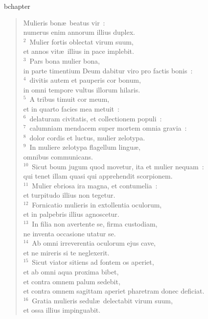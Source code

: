 bchapter\begin{verse}\vspace{-19pt}Mulieris bon\ae\ beatus vir~:\\ numerus enim annorum illius duplex.\\
${}^{2}$~Mulier fortis oblectat virum suum,\\ et annos vit\ae\ illius in pace implebit.\\
${}^{3}$~Pars bona mulier bona,\\ in parte timentium Deum dabitur viro pro factis bonis~:\\
${}^{4}$~divitis autem et pauperis cor bonum,\\ in omni tempore vultus illorum hilaris.\\
${}^{5}$~A tribus timuit cor meum,\\ et in quarto facies mea metuit~:\\
${}^{6}$~delaturam civitatis, et collectionem populi~:\\
${}^{7}$~calumniam mendacem super mortem omnia gravia~:\\
${}^{8}$~dolor cordis et luctus, mulier zelotypa.\\
${}^{9}$~In muliere zelotypa flagellum lingu\ae ,\\ omnibus communicans.\\
${}^{10}$~Sicut boum jugum quod movetur, ita et mulier nequam~:\\ qui tenet illam quasi qui apprehendit scorpionem.\\
${}^{11}$~Mulier ebriosa ira magna, et contumelia~:\\ et turpitudo illius non tegetur.\\
${}^{12}$~Fornicatio mulieris in extollentia oculorum,\\ et in palpebris illius agnoscetur.\\
${}^{13}$~In filia non avertente se, firma custodiam,\\ ne inventa occasione utatur se.\\
${}^{14}$~Ab omni irreverentia oculorum ejus cave,\\ et ne mireris si te neglexerit.\\
${}^{15}$~Sicut viator sitiens ad fontem os aperiet,\\ et ab omni aqua proxima bibet,\\ et contra omnem palum sedebit,\\ et contra omnem sagittam aperiet pharetram donec deficiat.\\
${}^{16}$~Gratia mulieris sedul\ae\ delectabit virum suum,\\ et ossa illius impinguabit.\\

\end{verse}
